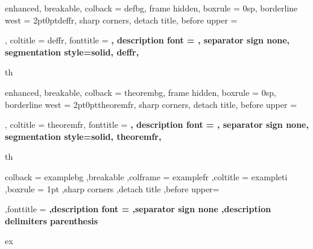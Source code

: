 \usepackage{array}

\newcommand\TODO{{\bfseries \color{red} \itshape \underline{Todo}}}


\usepackage{tikz}
\usepackage[most,many,breakable]{tcolorbox}

{%
	enhanced,
	breakable,
	colback = defbg,
	frame hidden,
	boxrule = 0sp,
	borderline west = {2pt}{0pt}{deffr},
	sharp corners,
	detach title,
	before upper = \tcbtitle\par\smallskip,
	coltitle = deffr,
	fonttitle = \bfseries\sffamily,
	description font = \mdseries,
	separator sign none,
	segmentation style={solid, deffr},
}
{th}


{%
	enhanced,
	breakable,
	colback = theorembg,
	frame hidden,
	boxrule = 0sp,
	borderline west = {2pt}{0pt}{theoremfr},
	sharp corners,
	detach title,
	before upper = \tcbtitle\par\smallskip,
	coltitle = theoremfr,
	fonttitle = \bfseries\sffamily,
	description font = \mdseries,
	separator sign none,
	segmentation style={solid, theoremfr},
}
{th}



{%
	colback = examplebg
	,breakable
	,colframe = examplefr
	,coltitle = exampleti
	,boxrule = 1pt
	,sharp corners
	,detach title
	,before upper=\tcbtitle\par\smallskip
	,fonttitle = \bfseries
	,description font = \mdseries
	,separator sign none
	,description delimiters parenthesis
}
{ex}